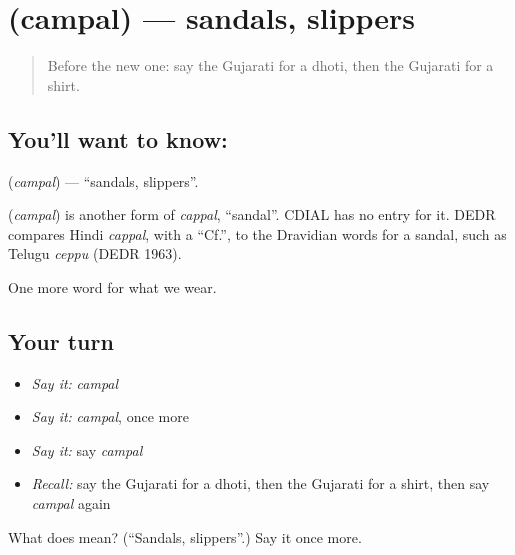 \section[\texorpdfstring{\gu{ચંપલ} (campal)}{ચંપલ (campal)}]{ (campal) — sandals, slippers}

\label{lesson:GU-C87-sandals}



\begin{quote}
Before the new one: say the Gujarati for a dhoti, then the Gujarati for a shirt.
\end{quote}

\subsection*{You'll want to know: }
\textbf{} (\emph{campal}) — \textquotedblleft{}sandals, slippers\textquotedblright{}.

\begin{cousinweb}
\textbf{} (\emph{campal}) is another form of \emph{cappal}, \textquotedblleft{}sandal\textquotedblright{}. CDIAL has no entry for it. DEDR compares Hindi \emph{cappal}, with a \textquotedblleft{}Cf.\textquotedblright{}, to the Dravidian words for a sandal, such as Telugu \emph{ceppu} (DEDR 1963).
\end{cousinweb}

\begin{grammarlens}[title={What you've built}]
One more word for what we wear.
\end{grammarlens}

\subsection*{Your turn}
\begin{itemize}
\raggedright
  \item \emph{Say it:} \emph{campal}
  \item \emph{Say it:} \emph{campal}, once more
  \item \emph{Say it:} say \emph{campal}
  \item \emph{Recall:} say the Gujarati for a dhoti, then the Gujarati for a shirt, then say \emph{campal} again
\end{itemize}

\begin{tcolorbox}[breakable,colback=teal!4,colframe=teal!35!black,title={Before you move on}]
What does  mean? (\textquotedblleft{}Sandals, slippers\textquotedblright{}.) Say it once more.
\end{tcolorbox}
